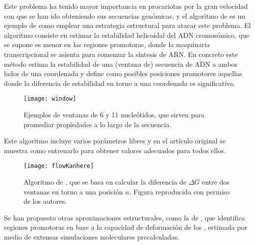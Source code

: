 Este problema ha tenido mayor importancia en procariotas por la gran velocidad con que se han ido obteniendo sus secuencias gen\'{o}micas, 
y el algoritmo de \cite{Kanhere2005} es un ejemplo de como emplear una estrategia estructural para atacar este problema. 
El algoritmo consiste en estimar la estabilidad helicoidal del ADN cromos\'{o}mico, que se supone es menor en
las regiones promotoras, donde la maquinaria transcripcional se asienta para comenzar la s\'{i}ntesis de ARN. 
En concreto este m\'{e}todo estima la estabilidad de una (ventana de) secuencia de ADN a ambos lados de una coordenada y define como posibles
posiciones promotores aquellas donde la diferencia de estabilidad en torno a una coordenada es significativa. 

\begin{figure}
\begin{center} 
\texttt{[image: window]}
\caption
{
Ejemplos de ventanas de 6 y 11 nucle\'{o}tidos, que sirven para promediar propiedades a lo largo de la secuencia.
}
\label{fig:window}
\end{center}
\end{figure}

Este algoritmo incluye varios par\'{a}metros libres y en el art\'{i}culo original se muestra como entrenarlo para obtener valores adecuados para todos ellos.

\begin{figure}
\begin{center} 
\texttt{[image: flowKanhere]}
\caption
{
Algoritmo de \cite{Kanhere2005}, que se basa en calcular la diferencia de $\Delta G$ entre dos ventanas en torno a una posici\'{o}n $n$.
Figura reproducida con permiso de los autores.
}
\label{fig:Kanhere}
\end{center}
\end{figure}

Se han propuesto otras aproximaciones estructurales, como la de \cite{Gogni2007}, %
que identifica regiones promotoras en base a la capacidad de deformaci\'{o}n de los 
,
estimada por medio de extensas simulaciones moleculares precalculadas. 

